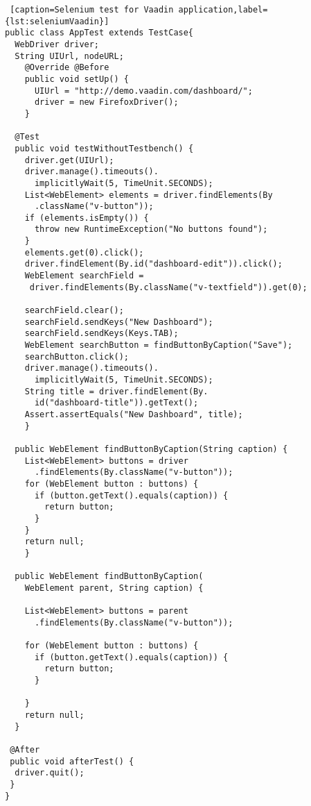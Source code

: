   	\lstset{style=a1listing}
  	\begin{lstlisting} [caption=Selenium test for Vaadin application,label={lst:seleniumVaadin}]
public class AppTest extends TestCase{
  WebDriver driver;
  String UIUrl, nodeURL;	
	@Override @Before
    public void setUp() {
      UIUrl = "http://demo.vaadin.com/dashboard/";
      driver = new FirefoxDriver();
    }

  @Test
  public void testWithoutTestbench() {
    driver.get(UIUrl);
    driver.manage().timeouts().
      implicitlyWait(5, TimeUnit.SECONDS);
    List<WebElement> elements = driver.findElements(By
      .className("v-button"));
    if (elements.isEmpty()) {
      throw new RuntimeException("No buttons found");
    }
    elements.get(0).click();
    driver.findElement(By.id("dashboard-edit")).click();
    WebElement searchField =
     driver.findElements(By.className("v-textfield")).get(0);
    
    searchField.clear();
    searchField.sendKeys("New Dashboard");
    searchField.sendKeys(Keys.TAB);
    WebElement searchButton = findButtonByCaption("Save");
    searchButton.click();
    driver.manage().timeouts().
      implicitlyWait(5, TimeUnit.SECONDS);
    String title = driver.findElement(By.
      id("dashboard-title")).getText();
    Assert.assertEquals("New Dashboard", title);
    }

  public WebElement findButtonByCaption(String caption) {
    List<WebElement> buttons = driver
      .findElements(By.className("v-button"));
    for (WebElement button : buttons) {
      if (button.getText().equals(caption)) {
        return button;
      }
    }
    return null;
    }

  public WebElement findButtonByCaption(
    WebElement parent, String caption) {
   
    List<WebElement> buttons = parent
      .findElements(By.className("v-button"));
    
    for (WebElement button : buttons) {
      if (button.getText().equals(caption)) {
        return button;
      }

    }
    return null;
  }

 @After
 public void afterTest() {
  driver.quit();
 }
}
\end{lstlisting}

